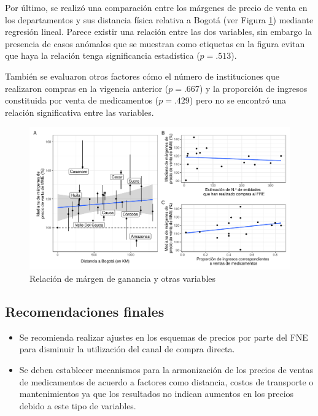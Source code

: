 \documentclass[
]{book}
\begin{document}
Por último, se realizó una comparación entre los márgenes de precio de venta en los departamentos y sus distancia física relativa a Bogotá (ver Figura \ref{fig:relacionMargenesCosto}) mediante regresión lineal. Parece existir una relación entre las dos variables, sin embargo la presencia de casos anómalos que se muestran como etiquetas en la figura evitan que haya la relación tenga significancia estadística (\(p = .513\)).

También se evaluaron otros factores cómo el número de instituciones que realizaron compras en la vigencia anterior (\(p = .667\)) y la proporción de ingresos constituida por venta de medicamentos (\(p = .429\)) pero no se encontró una relación significativa entre las variables.

\begin{figure}

{\centering \includegraphics[width=0.95\linewidth]{InformeFinal_files/figure-latex/relacionMargenesCosto-1} 

}

\caption{Relación de márgen de ganancia y otras variables}\label{fig:relacionMargenesCosto}
\end{figure}

\hypertarget{recomendaciones-finales}{%
\subsection{Recomendaciones finales}\label{recomendaciones-finales}}

\begin{itemize}
\item
  Se recomienda realizar ajustes en los esquemas de precios por parte del FNE para disminuir la utilización del canal de compra directa.
\item
  Se deben establecer mecanismos para la armonización de los precios de ventas de medicamentos de acuerdo a factores como distancia, costos de transporte o mantenimientos ya que los resultados no indican aumentos en los precios debido a este tipo de variables.
\end{itemize}
\end{document}
